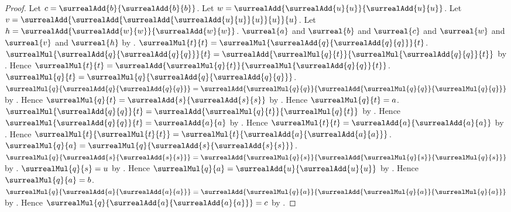 \begin{proof}
    Let $c=\surrealAdd{b}{\surrealAdd{b}{b}}$.
    Let $w=\surrealAdd{\surrealAdd{u}{u}}{\surrealAdd{u}{u}}$.
    Let $v=\surrealAdd{
        \surrealAdd{\surrealAdd{\surrealAdd{u}{u}}{u}}{u}}{u}$.
    Let $h=\surrealAdd{\surrealAdd{w}{w}}{\surrealAdd{w}{w}}$.
    $\surreal{a}$ and $\surreal{b}$ and $\surreal{c}$ and
    $\surreal{w}$ and $\surreal{v}$ and $\surreal{h}$
        by .
    $\surrealMul{t}{t}
        =\surrealMul{\surrealAdd{q}{\surrealAdd{q}{q}}}{t}$.
    $\surrealMul{\surrealAdd{q}{\surrealAdd{q}{q}}}{t}
            =\surrealAdd{\surrealMul{q}{t}}
                {\surrealMul{\surrealAdd{q}{q}}{t}}$
        by .
    Hence
        $\surrealMul{t}{t}
            =\surrealAdd{\surrealMul{q}{t}}
                {\surrealMul{\surrealAdd{q}{q}}{t}}$.
    $\surrealMul{q}{t}
        =\surrealMul{q}{\surrealAdd{q}{\surrealAdd{q}{q}}}$.
    $\surrealMul{q}{\surrealAdd{q}{\surrealAdd{q}{q}}}
        =\surrealAdd{\surrealMul{q}{q}}
            {\surrealAdd{\surrealMul{q}{q}}{\surrealMul{q}{q}}}$
        by .
    Hence
        $\surrealMul{q}{t}
            =\surrealAdd{s}{\surrealAdd{s}{s}}$
        by \auto.
    Hence $\surrealMul{q}{t}=a$.
    $\surrealMul{\surrealAdd{q}{q}}{t}
        =\surrealAdd{\surrealMul{q}{t}}{\surrealMul{q}{t}}$
        by .
    Hence
        $\surrealMul{\surrealAdd{q}{q}}{t}=\surrealAdd{a}{a}$
        by \auto.
    Hence $\surrealMul{t}{t}=\surrealAdd{a}{\surrealAdd{a}{a}}$
        by \auto.
    Hence
        $\surrealMul{t}{\surrealMul{t}{t}}
            =\surrealMul{t}{\surrealAdd{a}{\surrealAdd{a}{a}}}$.
    $\surrealMul{q}{a}
        =\surrealMul{q}{\surrealAdd{s}{\surrealAdd{s}{s}}}$.
    $\surrealMul{q}{\surrealAdd{s}{\surrealAdd{s}{s}}}
        =\surrealAdd{\surrealMul{q}{s}}
            {\surrealAdd{\surrealMul{q}{s}}{\surrealMul{q}{s}}}$
        by .
    $\surrealMul{q}{s}=u$
        by .
    Hence
        $\surrealMul{q}{a}=\surrealAdd{u}{\surrealAdd{u}{u}}$
        by \auto.
    Hence $\surrealMul{q}{a}=b$.
    $\surrealMul{q}{\surrealAdd{a}{\surrealAdd{a}{a}}}
        =\surrealAdd{\surrealMul{q}{a}}
            {\surrealAdd{\surrealMul{q}{a}}{\surrealMul{q}{a}}}$
        by .
    Hence
        $\surrealMul{q}{\surrealAdd{a}{\surrealAdd{a}{a}}}=c$
        by \auto.

\end{proof}
